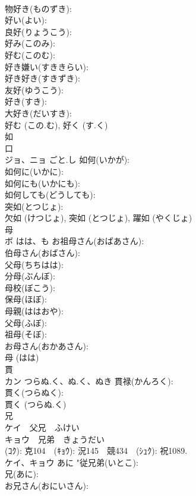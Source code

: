 \documentclass[8pt]{extreport}
\begin{document}
\begin{CJK}{UTF8}{min}
\\	物好き(ものずき): 
\\	好い(よい): 
\\	良好(りょうこう): 
\\	好み(このみ): 
\\	好む(このむ): 
\\	好き嫌い(すききらい): 
\\	好き好き(すきずき): 
\\	友好(ゆうこう): 
\\	好き(すき): 
\\	大好き(だいすき): 
\\	好む (この.む), 好く (す.く)
\\	如			
\\	口
\\	ジョ、ニョ	ごと.し	如何(いかが): 
\\	如何に(いかに): 
\\	如何にも(いかにも): 
\\	如何しても(どうしても): 
\\	突如(とつじょ): 
\\	欠如 (けつじょ), 突如 (とつじょ), 躍如 (やくじょ)
\\	母			
\\	ボ	はは、も	お祖母さん(おばあさん): 
\\	伯母さん(おばさん): 
\\	父母(ちちはは): 
\\	分母(ぶんぼ): 
\\	母校(ぼこう): 
\\	保母(ほぼ): 
\\	母親(ははおや): 
\\	父母(ふぼ): 
\\	祖母(そぼ): 
\\	お母さん(おかあさん): 
\\	母 (はは)
\\	貫			
\\	カン	つらぬ.く、ぬ.く、ぬき	貫禄(かんろく): 
\\	貫く(つらぬく): 
\\	貫く (つらぬ.く)
\\	兄			
\\	ケイ　父兄　ふけい　
\\	キョウ　兄弟　きょうだい
\\	(ｺｸ): 克104　(ｷｮｳ): 況145　競434　(ｼｭｸ): 祝1089.	
\\	ケイ、キョウ	あに	"従兄弟(いとこ): 
\\	兄(あに): 
\\	お兄さん(おにいさん): 

\end{CJK}
\end{document}
